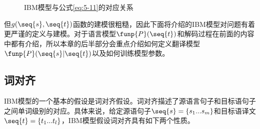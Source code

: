 \begin{figure}[htp]
    \centering

    \caption{IBM模型与公式\eqref{eq:5-11}的对应关系}
    \label{fig:5-14}
\end{figure}

\parinterval 但$g(\seq{s},\seq{t})$函数的建模很粗糙，因此下面将介绍的IBM模型对问题有着更严谨的定义与建模。对于语言模型$\funp{P}(\seq{t})$和解码过程在前面的内容中都有介绍，所以本章的后半部分会重点介绍如何定义翻译模型$\funp{P}(\seq{s}|\seq{t})$以及如何训练模型参数。


\subsection{词对齐}

\parinterval IBM模型的一个基本的假设是词对齐假设。词对齐描述了源语言句子和目标语句子之间单词级别的对应。具体来说，给定源语句子$\seq{s}=\{ s_1...s_m \}$和目标语译文$\seq{t}=\{ t_1...t_l \}$，IBM模型假设词对齐具有如下两个性质。

